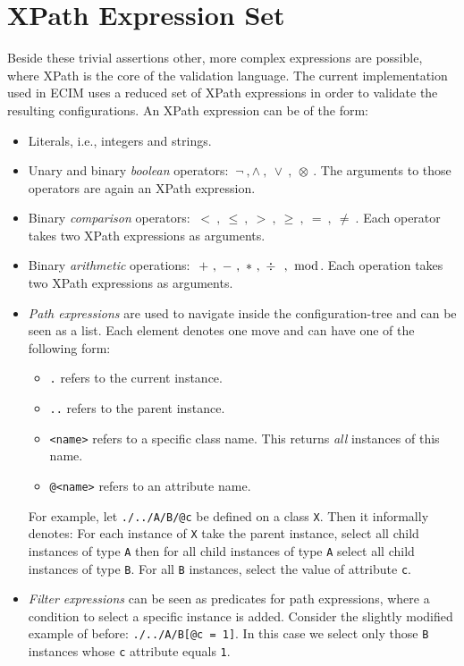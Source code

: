 \section{XPath Expression Set}\label{sec:xpath}
Beside these trivial assertions other, more complex expressions are possible, where XPath is the core of the validation language. The current implementation used in ECIM uses a reduced set of XPath expressions in order to validate the resulting configurations. An XPath expression can be of the form:
\begin{itemize}
 \item Literals, i.e., integers and strings.
  
  \item Unary and binary \emph{boolean} operators: $\ \neg\ ,\wedge\ ,\ \vee\ ,\ \otimes\ $. The arguments to those operators are again an XPath expression. 
  
  \item Binary \emph{comparison} operators: $\ <\ , \ \leq\ , \ >\  ,\ \geq\ , \ =\ , \ \neq\ $. Each operator takes two XPath expressions as arguments.
  
  \item Binary \emph{arithmetic} operations: $\ +\ , \ -\ , \ \ast\ , \ \div\ \ ,\ \bmod$. Each operation takes two XPath expressions as arguments.
  
  \item \emph{Path expressions} are used to navigate inside the configuration-tree and can be seen as a list. Each element denotes one move and can have one of the following form:
  \begin{itemize}
   \item \verb|.| refers to the current instance.
   \item \verb|..| refers to the parent instance.
   \item \verb|<name>| refers to a specific class name. This returns \emph{all} instances of this name.
   \item \verb|@<name>| refers to an attribute name.
  \end{itemize}
  For example, let \verb|./../A/B/@c| be defined on a class \verb|X|. Then it informally denotes: For each instance of \verb|X| take the parent instance, select all child instances of type \verb|A| then for all child instances of type \verb|A| select all child instances of type \verb|B|. For all \verb|B| instances, select the value of attribute \verb|c|. 
  
  
  \item \emph{Filter expressions} can be seen as predicates for path expressions, where a condition to select a specific instance is added. Consider the slightly modified example of before: \verb|./../A/B[@c = 1]|. In this case we select only those \verb|B| instances whose \verb|c| attribute equals \verb|1|. 
  

\end{itemize}
